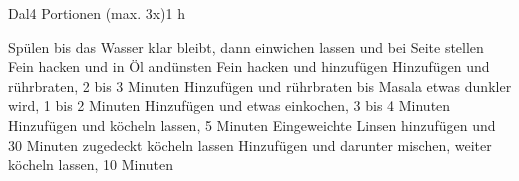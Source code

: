\begin{recipe}{Dal}{4 Portionen (max. 3x)}{1 h}

Spülen bis das Wasser klar bleibt, dann einwichen lassen und bei Seite stellen
Fein hacken und in Öl andünsten
Fein hacken und hinzufügen
Hinzufügen und rührbraten, 2 bis 3 Minuten
Hinzufügen und rührbraten bis Masala etwas dunkler wird, 1 bis 2 Minuten
Hinzufügen und etwas einkochen, 3 bis 4 Minuten
Hinzufügen und köcheln lassen, 5 Minuten
\ingredient[]{}{}
Eingeweichte Linsen hinzufügen und 30 Minuten zugedeckt köcheln lassen
Hinzufügen und darunter mischen, weiter köcheln lassen, 10 Minuten 

\end{recipe}
